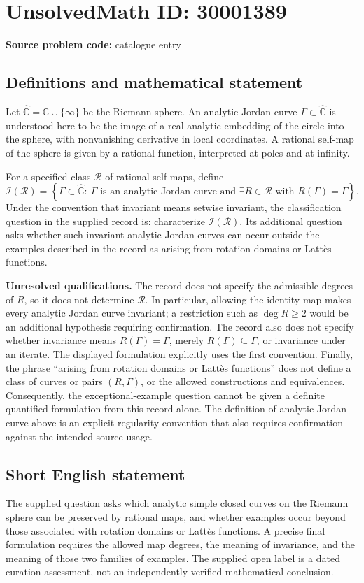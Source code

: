 \documentclass[11pt]{article}
\newcommand{\C}{\mathbb{C}}
\begin{document}
\section*{UnsolvedMath ID: 30001389}
\textbf{Source problem code:} catalogue entry
\subsection{Definitions and mathematical statement}
Let \(\widehat{\C}=\C\cup\{\infty\}\) be the Riemann sphere. An analytic Jordan curve \(\Gamma\subset\widehat{\C}\) is understood here to be the image of a real-analytic embedding of the circle into the sphere, with nonvanishing derivative in local coordinates. A rational self-map of the sphere is given by a rational function, interpreted at poles and at infinity.

For a specified class \(\mathcal R\) of rational self-maps, define
\[
\mathcal I(\mathcal R)=\left\{\Gamma\subset\widehat{\C}:\ \Gamma\text{ is an analytic Jordan curve and }\exists R\in\mathcal R\text{ with }R(\Gamma)=\Gamma\right\}.
\]
Under the convention that invariant means setwise invariant, the classification question in the supplied record is: characterize \(\mathcal I(\mathcal R)\). Its additional question asks whether such invariant analytic Jordan curves can occur outside the examples described in the record as arising from rotation domains or Latt\`es functions.

\textbf{Unresolved qualifications.} The record does not specify the admissible degrees of \(R\), so it does not determine \(\mathcal R\). In particular, allowing the identity map makes every analytic Jordan curve invariant; a restriction such as \(\deg R\geq2\) would be an additional hypothesis requiring confirmation. The record also does not specify whether invariance means \(R(\Gamma)=\Gamma\), merely \(R(\Gamma)\subseteq\Gamma\), or invariance under an iterate. The displayed formulation explicitly uses the first convention. Finally, the phrase ``arising from rotation domains or Latt\`es functions'' does not define a class of curves or pairs \((R,\Gamma)\), or the allowed constructions and equivalences. Consequently, the exceptional-example question cannot be given a definite quantified formulation from this record alone. The definition of analytic Jordan curve above is an explicit regularity convention that also requires confirmation against the intended source usage.
\subsection{Short English statement}
The supplied question asks which analytic simple closed curves on the Riemann sphere can be preserved by rational maps, and whether examples occur beyond those associated with rotation domains or Latt\`es functions. A precise final formulation requires the allowed map degrees, the meaning of invariance, and the meaning of those two families of examples. The supplied open label is a dated curation assessment, not an independently verified mathematical conclusion.
\end{document}
